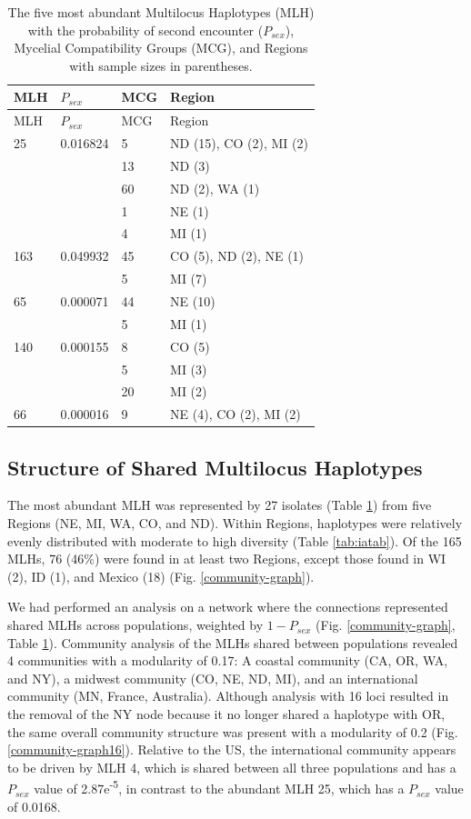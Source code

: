 \documentclass[fleqn,10pt,lineno]{wlpeerj} %
\theoremstyle{definition}
\theoremstyle{definition}
\theoremstyle{definition}
\theoremstyle{remark}
\begin{document}
\begin{longtable}[]{@{}llll@{}}
\caption{\label{tab:mlg-table} The five most abundant Multilocus Haplotypes
(MLH) with the probability of second encounter (\(P_{sex}\)), Mycelial
Compatibility Groups (MCG), and Regions with sample sizes in
parentheses.}\tabularnewline
\toprule
MLH & \(P_{sex}\) & MCG & Region\tabularnewline
\midrule
\endfirsthead
\toprule
MLH & \(P_{sex}\) & MCG & Region\tabularnewline
\midrule
\endhead
25 & 0.016824 & 5 & ND (15), CO (2), MI (2)\tabularnewline
& & 13 & ND (3)\tabularnewline
& & 60 & ND (2), WA (1)\tabularnewline
& & 1 & NE (1)\tabularnewline
& & 4 & MI (1)\tabularnewline
163 & 0.049932 & 45 & CO (5), ND (2), NE (1)\tabularnewline
& & 5 & MI (7)\tabularnewline
65 & 0.000071 & 44 & NE (10)\tabularnewline
& & 5 & MI (1)\tabularnewline
140 & 0.000155 & 8 & CO (5)\tabularnewline
& & 5 & MI (3)\tabularnewline
& & 20 & MI (2)\tabularnewline
66 & 0.000016 & 9 & NE (4), CO (2), MI (2)\tabularnewline
\bottomrule
\end{longtable}

\subsection*{Structure of Shared Multilocus
Haplotypes}\label{structure-of-shared-multilocus-haplotypes}

The most abundant MLH was represented by 27 isolates (Table
\ref{tab:mlg-table}) from five Regions (NE, MI, WA, CO, and ND). Within
Regions, haplotypes were relatively evenly distributed with moderate to
high diversity (Table \ref{tab:iatab}). Of the 165 MLHs, 76 (46\%) were
found in at least two Regions, except those found in WI (2), ID (1), and
Mexico (18) (Fig. \ref{community-graph}).

We had performed an analysis on a network where the connections
represented shared MLHs across populations, weighted by \(1 - P_{sex}\)
(Fig. \ref{community-graph}, Table \ref{tab:mlg-table}). Community
analysis of the MLHs shared between populations revealed 4 communities
with a modularity of 0.17: A coastal community (CA, OR, WA, and NY), a
midwest community (CO, NE, ND, MI), and an international community (MN,
France, Australia). Although analysis with 16 loci resulted in the
removal of the NY node because it no longer shared a haplotype with OR,
the same overall community structure was present with a modularity of
0.2 (Fig. \ref{community-graph16}). Relative to the US, the
international community appears to be driven by MLH 4, which is shared
between all three populations and has a \(P_{sex}\) value of
2.87e\textsuperscript{-5}, in contrast to the abundant MLH 25, which has
a \(P_{sex}\) value of 0.0168.
\end{document}
